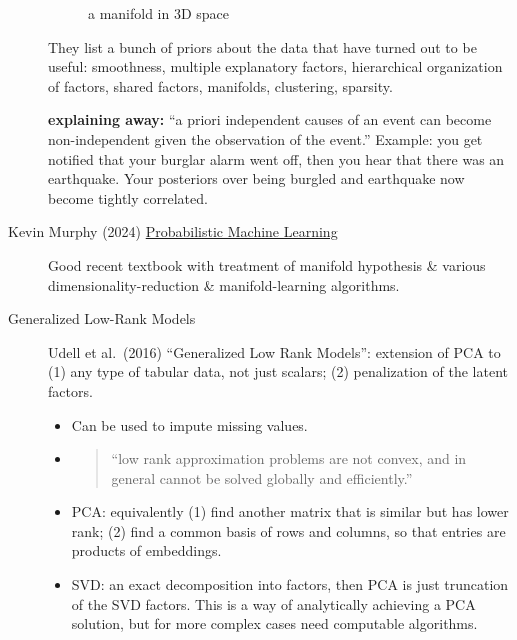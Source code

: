 \documentclass[
  10pt,
  letterpaper,
  DIV=11,
  numbers=noendperiod,
  oneside]{scrartcl}
\providecommand{\tightlist}{%
  \setlength{\itemsep}{0pt}\setlength{\parskip}{0pt}}\usepackage{longtable,booktabs,array}
\begin{document}
\begin{description}
\begin{figure}[H]
{}

\caption{a manifold in 3D space}

\end{figure}%

They list a bunch of priors about the data that have turned out to be
useful: smoothness, multiple explanatory factors, hierarchical
organization of factors, shared factors, manifolds, clustering,
sparsity.

\textbf{explaining away:} ``a priori independent causes of an event can
become non-independent given the observation of the event.'' Example:
you get notified that your burglar alarm went off, then you hear that
there was an earthquake. Your posteriors over being burgled and
earthquake now become tightly correlated.
\item[Kevin Murphy (2024)
\href{https://probml.github.io/pml-book/book1.html}{Probabilistic
Machine Learning}]
Good recent textbook with treatment of manifold hypothesis \& various
dimensionality-reduction \& manifold-learning algorithms.
\item[Generalized Low-Rank Models]
Udell et al.~(2016) ``Generalized Low Rank Models'': extension of PCA to
(1) any type of tabular data, not just scalars; (2) penalization of the
latent factors.

\begin{itemize}
\tightlist
\item
  Can be used to impute missing values.
\end{itemize}

\begin{itemize}
\item
  \begin{quote}
  ``low rank approximation problems are not convex, and in general
  cannot be solved globally and efficiently.''
  \end{quote}
\end{itemize}

\begin{itemize}
\tightlist
\item
  PCA: equivalently (1) find another matrix that is similar but has
  lower rank; (2) find a common basis of rows and columns, so that
  entries are products of embeddings.
\end{itemize}

\begin{itemize}
\tightlist
\item
  SVD: an exact decomposition into factors, then PCA is just truncation
  of the SVD factors. This is a way of analytically achieving a PCA
  solution, but for more complex cases need computable algorithms.
\end{itemize}


\end{description}
\end{document}

